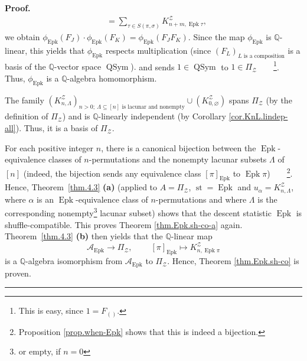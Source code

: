 \documentclass[numbers=enddot,12pt,final,onecolumn,notitlepage]{scrartcl}%
\theoremstyle{definition}
\newenvironment{proof}[1][Proof]{\noindent\textbf{#1.} }{\ \rule{0.5em}{0.5em}}
\let\sumnonlimits\sum
\renewcommand{\sum}{\sumnonlimits\limits}
\begin{document}
\begin{proof}
{\begin{align*}
&  =\sum_{\tau\in S\left(  \pi,\sigma\right)  }K_{n+m,\operatorname*{Epk}\tau
}^{\mathcal{Z}},
\end{align*}
we obtain $\phi_{\operatorname*{Epk}}\left(  F_{J}\right)  \cdot
\phi_{\operatorname*{Epk}}\left(  F_{K}\right)  =\phi_{\operatorname*{Epk}%
}\left(  F_{J}F_{K}\right)  $. Since the map $\phi_{\operatorname*{Epk}}$ is
$\mathbb{Q}$-linear, this yields that $\phi_{\operatorname*{Epk}}$ respects
multiplication (since $\left(  F_{L}\right)  _{L\text{ is a composition}}$ is
a basis of the $\mathbb{Q}$-vector space $\operatorname*{QSym}$).} and sends
$1\in\operatorname*{QSym}$ to $1\in\Pi_{\mathcal{Z}}$\ \ \ \ \footnote{This is
easy, since $1=F_{\left(  {}\right)  }$.}. Thus, $\phi_{\operatorname*{Epk}}$
is a $\mathbb{Q}$-algebra homomorphism.

The family $\left(  K_{n,\Lambda}^{\mathcal{Z}}\right)  _{n>0;\ \Lambda
\subseteq\left[  n\right]  \text{ is lacunar and nonempty}}\cup\left(
K_{0,\varnothing}^{\mathcal{Z}}\right)  $ spans $\Pi_{\mathcal{Z}}$ (by the
definition of $\Pi_{\mathcal{Z}}$) and is $\mathbb{Q}$-linearly independent
(by Corollary \ref{cor.KnL.lindep-all}). Thus, it is a basis of $\Pi
_{\mathcal{Z}}$.

For each positive integer $n$, there is a canonical bijection between the
$\operatorname*{Epk}$-equivalence classes of $n$-permutations and the nonempty
lacunar subsets $\Lambda$ of $\left[  n\right]  $ (indeed, the bijection sends
any equivalence class $\left[  \pi\right]  _{\operatorname*{Epk}}$ to
$\operatorname*{Epk}\pi$)\ \ \ \ \footnote{Proposition \ref{prop.when-Epk}
shows that this is indeed a bijection.}. Hence, Theorem~\ref{thm.4.3}
\textbf{(a)} (applied to $A=\Pi_{\mathcal{Z}}$, $\operatorname*{st}%
=\operatorname*{Epk}$ and $u_{\alpha}=K_{n,\Lambda}^{\mathcal{Z}}$, where
$\alpha$ is an $\operatorname*{Epk}$-equivalence class of $n$-permutations and
where $\Lambda$ is the corresponding nonempty\footnote{or empty, if $n=0$}
lacunar subset) shows that the descent statistic $\operatorname*{Epk}$ is
shuffle-compatible. This proves Theorem \ref{thm.Epk.sh-co-a} again.
Theorem~\ref{thm.4.3} \textbf{(b)} then yields that the $\mathbb{Q}$-linear
map%
\[
\mathcal{A}_{\operatorname*{Epk}}\rightarrow\Pi_{\mathcal{Z}}%
,\ \ \ \ \ \ \ \ \ \ \left[  \pi\right]  _{\operatorname*{Epk}}\mapsto
K_{n,\operatorname*{Epk}\pi}^{\mathcal{Z}}%
\]
is a $\mathbb{Q}$-algebra isomorphism from $\mathcal{A}_{\operatorname*{Epk}}$
to $\Pi_{\mathcal{Z}}$. Hence, Theorem \ref{thm.Epk.sh-co} is proven.
\end{proof}
\end{document}
